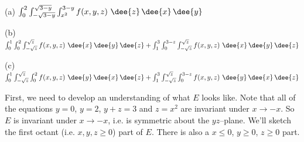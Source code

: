 \begin{answer}
(a) $\int_0^2 \int_{-\sqrt{3-y}}^{\sqrt{3-y}} \int_{x^2}^{3-y} 
                 f(x,y,z)\ \dee{z}\,\dee{x}\,\dee{y}$

(b) $\int_0^1 \int_0^2 \int_{-\sqrt{z}}^{\sqrt{z}} f(x,y,z)\    
                 \dee{x}\,\dee{y}\,\dee{z}
     +\int_1^3 \int_0^{3-z} \int_{-\sqrt{z}}^{\sqrt{z}} f(x,y,z)\    
                 \dee{x}\,\dee{y}\,\dee{z}$

(c) $\int_0^1  \int_{-\sqrt{z}}^{\sqrt{z}}\int_0^2 f(x,y,z)\    
                 \dee{y}\,\dee{x}\,\dee{z}
    +\int_1^3 \int_{-\sqrt{z}}^{\sqrt{z}}  \int_0^{3-z} f(x,y,z)\    
                 \dee{y}\,\dee{x}\,\dee{z}$
\end{answer}

\begin{solution}
First, we need to develop an understanding of what $E$ looks like.
Note that all of the equations $y=0$, $y=2$, $y+z=3$ and $z=x^2$
are invariant under $x\rightarrow -x$. So $E$ is invariant under 
$x\rightarrow -x$, i.e. is symmetric about the $yz$--plane. We'll sketch
the first octant (i.e. $x,y,z\ge 0$) part of $E$. There is also a
$x\le 0$, $y\ge 0$, $z\ge 0$ part.


\end{solution}
